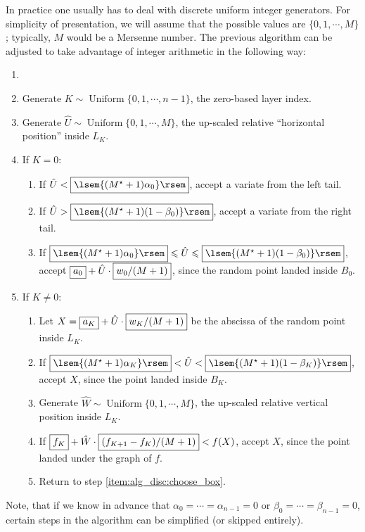 \documentclass{article}
\renewcommand{\leq}{\leqslant}
\theoremstyle{definition} %
\newenvironment{algorithm}[1]
  {\renewcommand\theAUXalgorithm{#1}\AUXalgorithm\begin{enumerate}\item[]}
  {\end{enumerate}\endAUXalgorithm}
\DeclareMathOperator{\DUnif}{\mathrm{Uniform}} %
\newcommand{\nolabel}[1]{}
\newcommand{\cache}[1]{\fbox{$#1$}}
\newcommand{\round}[1]{\lsem{#1}\rsem}
\begin{document}
In practice one usually has to deal with discrete uniform integer generators. For simplicity of presentation, we will assume that the possible values are $\{ 0, 1, \cdots , M \}$; typically, $M$ would be a Mersenne number.
The previous algorithm can be adjusted to take advantage of integer arithmetic in the following way:
\begin{algorithm}{(Discrete uniform integer generators)}
    \item \label{item:alg_disc:choose_box} Generate $K \sim \DUnif \{ 0, 1, \cdots , n - 1 \}$, the zero-based layer index.

    \item \nolabel{item:alg_disc:horizontal} Generate $\hat{U} \sim \DUnif \{ 0, 1, \cdots , M \}$, the up-scaled relative ``horizontal position'' inside $L_K$.

    \item \nolabel{item:alg_disc:bottom_layer} If $K = 0$:
        \begin{enumerate}
            \item If $\hat{U} < \cache{\round{(M^\star + 1) \alpha _0}}$, accept a variate from the left tail.
            \item If $\hat{U} > \cache{\round{(M^\star + 1) (1 - \beta _0)}}$, accept a variate from the right tail.
            \item If $\cache{\round{(M^\star + 1) \alpha _0}} \leq \hat{U} \leq \cache{\round{(M^\star + 1) (1 - \beta _0)}}$, accept $\cache{a_0} + \hat{U} \cdot \cache{w_0  / (M + 1)}$, since the random point landed inside $B_0$.
        \end{enumerate}

    \item \nolabel{item:alg_disc:other_layers} If $K \neq 0$:
        \begin{enumerate}
            \item Let $X = \cache{a_K} + \hat{U} \cdot \cache{w_K / (M + 1)}$ be the abscissa of the random point inside $L_K$.
            \item If $\cache{\round{(M^\star + 1) \alpha _K}} < \hat{U} < \cache{\round{(M^\star + 1) (1 - \beta _K)}}$, accept $X$, since the point landed inside $B_K$.
            \item Generate $\hat{W} \sim \DUnif \{0, 1, \cdots , M \}$, the up-scaled relative vertical position inside $L_K$.
            \item If $\cache{f_K} + \hat{W} \cdot \cache{(f_{K + 1} - f_{K}) / (M + 1)} < f(X)$, accept $X$, since the point landed under the graph of $f$.
            \item Return to step \ref{item:alg_disc:choose_box}.
        \end{enumerate}
\end{algorithm}
%
Note, that if we know in advance that $\alpha _0 = \cdots = \alpha _{n - 1} = 0$ or $\beta _0 = \cdots = \beta _{n - 1} = 0$, certain steps in the algorithm can be simplified (or skipped entirely).
\end{document}
